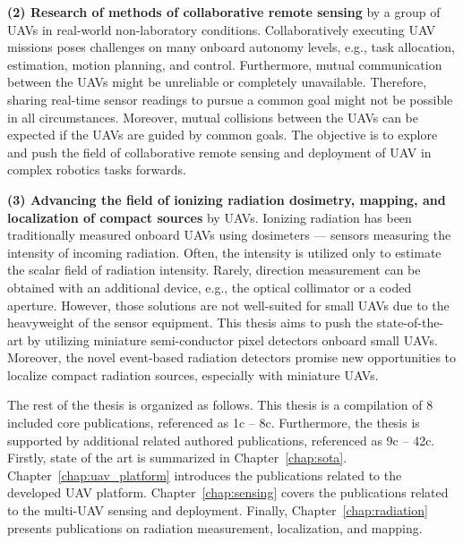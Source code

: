 \documentclass[a4paper,11pt,titlepage,twoside]{book}
\begin{document}
\textbf{(2) Research of methods of collaborative remote sensing} by a group of \aclp{UAV} in real-world non-laboratory conditions.
Collaboratively executing UAV missions poses challenges on many onboard autonomy levels, e.g., task allocation, estimation, motion planning, and control.
Furthermore, mutual communication between the \acp{UAV} might be unreliable or completely unavailable.
Therefore, sharing real-time sensor readings to pursue a common goal might not be possible in all circumstances.
Moreover, mutual collisions between the \acp{UAV} can be expected if the \acp{UAV} are guided by common goals.
The objective is to explore and push the field of collaborative remote sensing and deployment of \ac{UAV} in complex robotics tasks forwards.

\textbf{(3) Advancing the field of ionizing radiation dosimetry, mapping, and localization of compact sources} by \aclp{UAV}.
Ionizing radiation has been traditionally measured onboard \acp{UAV} using dosimeters \cite{nagatani2013emergency, sanada2015aerial, towler2012radiation, jiang2016prototype} --- sensors measuring the intensity of incoming radiation.
Often, the intensity is utilized only to estimate the scalar field of radiation intensity.
Rarely, direction measurement can be obtained with an additional device, e.g., the optical collimator or a coded aperture.
However, those solutions are not well-suited for small \acp{UAV} due to the heavyweight of the sensor equipment.
This thesis aims to push the state-of-the-art by utilizing miniature semi-conductor pixel detectors \cite{llopart2007timepix} onboard small \acp{UAV}.
Moreover, the novel event-based radiation detectors \cite{poikela2014timepix3} promise new opportunities to localize compact radiation sources, especially with miniature \acp{UAV}.

The rest of the thesis is organized as follows.
This thesis is a compilation of 8 included core publications, referenced as 1c -- 8c.
Furthermore, the thesis is supported by additional related authored publications, referenced as 9c -- 42c.
Firstly, state of the art is summarized in Chapter~\ref{chap:sota}.
Chapter~\ref{chap:uav_platform} introduces the publications related to the developed \ac{UAV} platform.
Chapter~\ref{chap:sensing} covers the publications related to the multi-\ac{UAV} sensing and deployment.
Finally, Chapter~\ref{chap:radiation} presents publications on radiation measurement, localization, and mapping.


\end{document}
